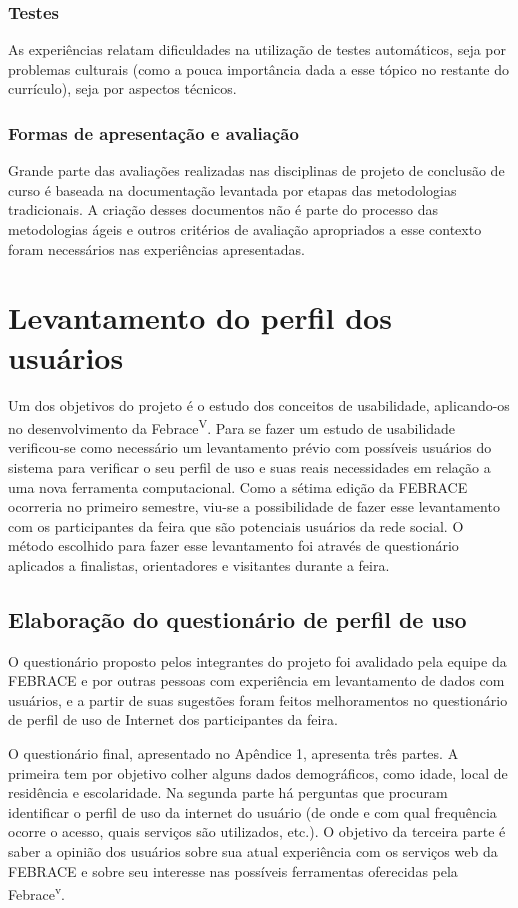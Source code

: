     \subsubsection{Testes}
      As experiências relatam dificuldades na utilização de testes automáticos, seja por problemas culturais (como a pouca importância dada a esse tópico no restante do currículo), seja por aspectos técnicos.

    \subsubsection{Formas de apresentação e avaliação}
      Grande parte das avaliações realizadas nas disciplinas de projeto de conclusão de curso é baseada na documentação levantada por etapas das metodologias tradicionais. A criação desses documentos não é parte do processo das metodologias ágeis e outros critérios de avaliação apropriados a esse contexto foram necessários nas experiências apresentadas.

\section{Levantamento do perfil dos usuários}
  Um dos objetivos do projeto é o estudo dos conceitos de usabilidade, aplicando-os no desenvolvimento da Febrace\textsuperscript{V}. Para se fazer um estudo de usabilidade verificou-se como necessário um levantamento prévio com possíveis usuários do sistema para verificar o seu perfil de uso e suas reais necessidades em relação a uma nova ferramenta computacional. Como a sétima edição da FEBRACE ocorreria no primeiro semestre, viu-se a possibilidade de fazer esse levantamento com os participantes da feira que são potenciais usuários da rede social. O método escolhido para fazer esse levantamento foi através de questionário aplicados a finalistas, orientadores e visitantes durante a feira.

  \subsection{Elaboração do questionário de perfil de uso}
    O questionário proposto pelos integrantes do projeto foi avalidado pela equipe da FEBRACE e por outras pessoas com experiência em levantamento de dados com usuários, e a partir de suas sugestões foram feitos melhoramentos no questionário de perfil de uso de Internet dos participantes da feira.

    O questionário final, apresentado no Apêndice 1, apresenta três partes. A primeira tem por objetivo colher alguns dados demográficos, como idade, local de residência e escolaridade. Na segunda parte há perguntas que procuram identificar o perfil de uso da internet do usuário (de onde e com qual frequência ocorre o acesso, quais serviços são utilizados, etc.). O objetivo da terceira parte é saber a opinião dos usuários sobre sua atual experiência com os serviços web da FEBRACE e sobre seu interesse nas possíveis ferramentas oferecidas pela Febrace\textsuperscript{v}.

